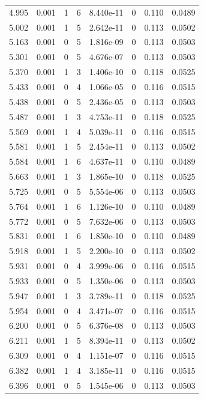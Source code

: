 \documentclass[preview]{standalone}
\begin{document}
{{{\begin{tabular}{L{1.2cm}C{1.2cm} C{0.3cm}C{0.5cm} C{1.4cm}C{1.4cm} C{1.4cm}C{1.4cm}}
  4.995  &  0.001  & 1     &  6 &  8.440e-11  & 0  & 0.110 &  0.0489   \\ 
  5.002  &  0.001  & 1     &  5 &  2.642e-11  & 0  & 0.113 &  0.0502   \\ 
  5.163  &  0.001  & 0     &  5 &  1.816e-09  & 0  & 0.113 &  0.0503   \\ 
  5.301  &  0.001  & 0     &  5 &  4.676e-07  & 0  & 0.113 &  0.0503   \\ 
  5.370  &  0.001  & 1     &  3 &  1.406e-10  & 0  & 0.118 &  0.0525   \\ 
  5.433  &  0.001  & 0     &  4 &  1.066e-05  & 0  & 0.116 &  0.0515   \\ 
  5.438  &  0.001  & 0     &  5 &  2.436e-05  & 0  & 0.113 &  0.0503   \\ 
  5.487  &  0.001  & 1     &  3 &  4.753e-11  & 0  & 0.118 &  0.0525   \\ 
  5.569  &  0.001  & 1     &  4 &  5.039e-11  & 0  & 0.116 &  0.0515   \\ 
  5.581  &  0.001  & 1     &  5 &  2.454e-11  & 0  & 0.113 &  0.0502   \\ 
  5.584  &  0.001  & 1     &  6 &  4.637e-11  & 0  & 0.110 &  0.0489   \\ 
  5.663  &  0.001  & 1     &  3 &  1.865e-10  & 0  & 0.118 &  0.0525   \\ 
  5.725  &  0.001  & 0     &  5 &  5.554e-06  & 0  & 0.113 &  0.0503   \\ 
  5.764  &  0.001  & 1     &  6 &  1.126e-10  & 0  & 0.110 &  0.0489   \\ 
  5.772  &  0.001  & 0     &  5 &  7.632e-06  & 0  & 0.113 &  0.0503   \\ 
  5.831  &  0.001  & 1     &  6 &  1.850e-10  & 0  & 0.110 &  0.0489   \\ 
  5.918  &  0.001  & 1     &  5 &  2.200e-10  & 0  & 0.113 &  0.0502   \\ 
  5.931  &  0.001  & 0     &  4 &  3.999e-06  & 0  & 0.116 &  0.0515   \\ 
  5.933  &  0.001  & 0     &  5 &  1.350e-06  & 0  & 0.113 &  0.0503   \\ 
  5.947  &  0.001  & 1     &  3 &  3.789e-11  & 0  & 0.118 &  0.0525   \\ 
  5.954  &  0.001  & 0     &  4 &  3.471e-07  & 0  & 0.116 &  0.0515   \\ 
  6.200  &  0.001  & 0     &  5 &  6.376e-08  & 0  & 0.113 &  0.0503   \\ 
  6.211  &  0.001  & 1     &  5 &  8.394e-11  & 0  & 0.113 &  0.0502   \\ 
  6.309  &  0.001  & 0     &  4 &  1.151e-07  & 0  & 0.116 &  0.0515   \\ 
  6.382  &  0.001  & 1     &  4 &  3.185e-11  & 0  & 0.116 &  0.0515   \\ 
  6.396  &  0.001  & 0     &  5 &  1.545e-06  & 0  & 0.113 &  0.0503   \\ 
\hline 
\end{tabular} 

}}}
\end{document}
